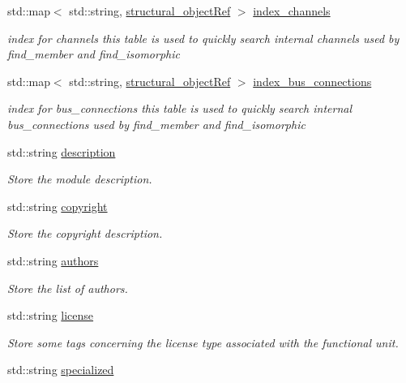 \begin{DoxyCompactItemize}
std\+::map$<$ std\+::string, \hyperlink{structural__objects_8hpp_a8ea5f8cc50ab8f4c31e2751074ff60b2}{structural\+\_\+object\+Ref} $>$ \hyperlink{classmodule_a6cfe29c1057a2c772f4bfa8b2fffd0fa}{index\+\_\+channels}
\begin{DoxyCompactList}\small\item\em index for channels this table is used to quickly search internal channels used by find\+\_\+member and find\+\_\+isomorphic \end{DoxyCompactList}\item 
std\+::map$<$ std\+::string, \hyperlink{structural__objects_8hpp_a8ea5f8cc50ab8f4c31e2751074ff60b2}{structural\+\_\+object\+Ref} $>$ \hyperlink{classmodule_acc95d1b1134c0d763845bff62c013e55}{index\+\_\+bus\+\_\+connections}
\begin{DoxyCompactList}\small\item\em index for bus\+\_\+connections this table is used to quickly search internal bus\+\_\+connections used by find\+\_\+member and find\+\_\+isomorphic \end{DoxyCompactList}\item 
std\+::string \hyperlink{classmodule_a7afe74efac4110a3ebcdd87e5bdc013a}{description}
\begin{DoxyCompactList}\small\item\em Store the module description. \end{DoxyCompactList}\item 
std\+::string \hyperlink{classmodule_acc39ee17da33ea6d545e7d3d46262096}{copyright}
\begin{DoxyCompactList}\small\item\em Store the copyright description. \end{DoxyCompactList}\item 
std\+::string \hyperlink{classmodule_ace978d8e371beb99e26663f72eed7875}{authors}
\begin{DoxyCompactList}\small\item\em Store the list of authors. \end{DoxyCompactList}\item 
std\+::string \hyperlink{classmodule_afc3e93ad59925ead9e025e0bc747e50f}{license}
\begin{DoxyCompactList}\small\item\em Store some tags concerning the license type associated with the functional unit. \end{DoxyCompactList}\item 
std\+::string \hyperlink{classmodule_a8b4418fa829899d9fe89122c85566433}{specialized}

\end{DoxyCompactItemize}
